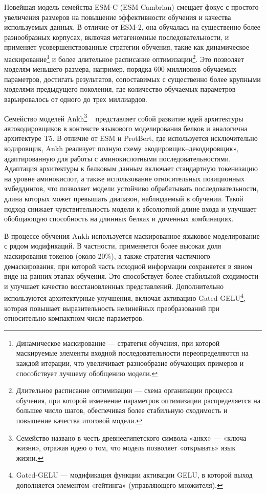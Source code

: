 \documentclass[specification,annotation,times]{itmo-student-thesis}
\begin{document}
Новейшая модель семейства ESM-C (ESM Cambrian) смещает фокус с простого увеличения размеров на повышение эффективности обучения и качества используемых данных. В отличие от ESM-2, она обучалась на существенно более разнообразных корпусах, включая метагеномные последовательности, и применяет усовершенствованные стратегии обучения, такие как динамическое маскирование\footnote{Динамическое маскирование — стратегия обучения, при которой маскируемые элементы входной последовательности переопределяются на каждой итерации, что увеличивает разнообразие обучающих примеров и способствует лучшему обобщению модели.} и более длительное расписание оптимизации\footnote{Длительное расписание оптимизации — схема организации процесса обучения, при которой изменение параметров оптимизации распределяется на большее число шагов, обеспечивая более стабильную сходимость и повышение качества итоговой модели.}. Это позволяет моделям меньшего размера, например, порядка 600 миллионов обучаемых параметров, достигать результатов, сопоставимых с существенно более крупными моделями предыдущего поколения, где количество обучаемых параметров варьировалось от одного до трех миллиардов.

Семейство моделей Ankh\footnote{Семейство названо в честь древнеегипетского символа «анкх» — «ключа жизни», отражая идею о том, что модель позволяет «открывать» язык жизни.} ~\cite{Elnaggar2023.01.16.524265} представляет собой развитие идей архитектуры автокодировщиков в контексте языкового моделирования белков и аналогична архитектуре T5. В отличие от ESM и ProtBert, где используется исключительно кодировщик, Ankh реализует полную схему «кодировщик–декодировщик», адаптированную для работы с аминокислотными последовательностями. Адаптация архитектуры к белковым данным включает стандартную токенизацию на уровне аминокислот, а также использование относительных позиционных эмбеддингов, что позволяет модели устойчиво обрабатывать последовательности, длина которых может превышать диапазон, наблюдаемый в обучении. Такой подход снижает чувствительность модели к абсолютной длине входа и улучшает обобщающую способность на длинных белках и доменных комбинациях.

В процессе обучения Ankh используется маскированное языковое моделирование с рядом модификаций. В частности, применяется более высокая доля маскирования токенов (около 20\%), а также стратегия частичного демаскирования, при которой часть исходной информации сохраняется в явном виде на ранних этапах обучения. Это способствует более стабильной сходимости и улучшает качество восстановленных представлений. Дополнительно используются архитектурные улучшения, включая активацию Gated-GELU\footnote{Gated-GELU — модификация функции активации GELU, в которой выход дополняется элементом «гейтинга» (управляющего множителя).}, которая повышает выразительность нелинейных преобразований при относительно компактном числе параметров.
\end{document}
